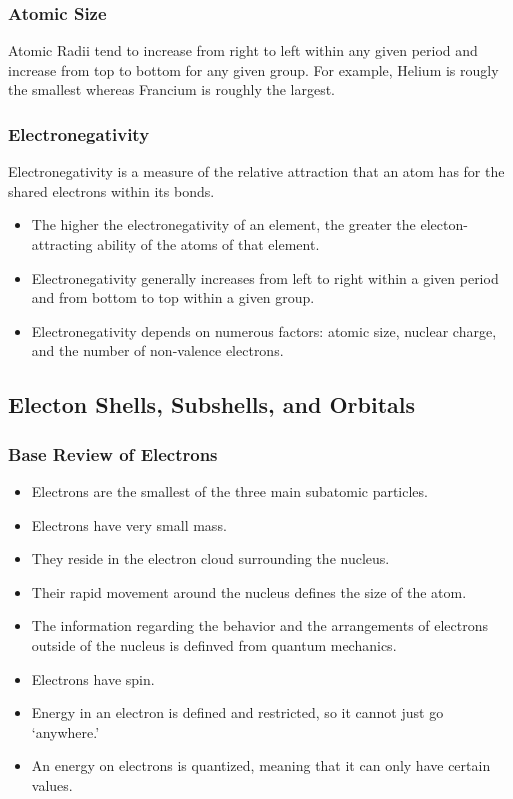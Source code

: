 \noindent
{}

\subsubsection{Atomic Size}

Atomic Radii tend to increase from right to left within any given period and increase from top to bottom for any given group. For example, Helium is rougly the smallest whereas Francium is roughly the largest.

\subsubsection{Electronegativity}

\begin{defn}
Electronegativity is a measure of the relative attraction that an atom has for the shared electrons within its bonds.
\end{defn}

\begin{itemize}
\item The higher the electronegativity of an element, the greater the electon-attracting ability of the atoms of that element.
\item Electronegativity generally increases from left to right within a given period and from bottom to top within a given group.
\item Electronegativity depends on numerous factors: atomic size, nuclear charge, and the number of non-valence electrons.
\end{itemize}

\subsection{Electon Shells, Subshells, and Orbitals}

\subsubsection{Base Review of Electrons}

\begin{itemize}
\item Electrons are the smallest of the three main subatomic particles.
\item Electrons have very small mass.
\item They reside in the electron cloud surrounding the nucleus.
\item Their rapid movement around the nucleus defines the size of the atom.
\item The information regarding the behavior and the arrangements of electrons outside of the nucleus is definved from quantum mechanics.
\item Electrons have spin.
\item Energy in an electron is defined and restricted, so it cannot just go `anywhere.'
\item An energy on electrons is quantized, meaning that it can only have certain values.
\end{itemize}

